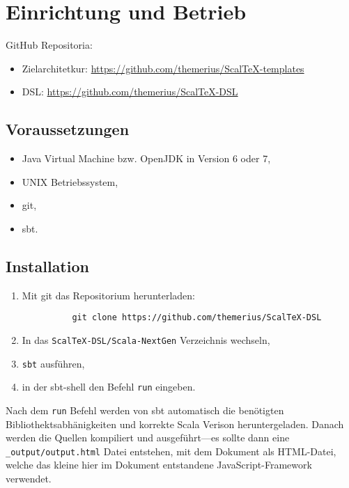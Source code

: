 \chapter{Einrichtung und Betrieb}

GitHub Repositoria:

\begin{itemize}
  \item Zielarchitetkur: \url{https://github.com/themerius/ScalTeX-templates}
  \item DSL: \url{https://github.com/themerius/ScalTeX-DSL}
\end{itemize}

\section{Voraussetzungen}

\begin{itemize}
  \item Java Virtual Machine bzw. OpenJDK in Version 6 oder 7,
  \item UNIX Betriebssystem,
  \item git,
  \item sbt.
\end{itemize}

\section{Installation}

\begin{enumerate}
  \item Mit git das Repositorium herunterladen:
        \begin{verbatim}
          git clone https://github.com/themerius/ScalTeX-DSL
        \end{verbatim}
  \item In das \verb+ScalTeX-DSL/Scala-NextGen+ Verzeichnis wechseln,
  \item \verb+sbt+ ausführen,
  \item in der sbt-shell den Befehl \verb+run+ eingeben.
\end{enumerate}

Nach dem \verb+run+ Befehl werden von sbt automatisch die benötigten
Bibliothektsabhänigkeiten und korrekte Scala Verison heruntergeladen.
Danach werden die Quellen kompiliert und ausgeführt---es sollte dann eine
\verb+_output/output.html+ Datei entstehen, mit dem Dokument als HTML-Datei,
welche das kleine hier im Dokument entstandene JavaScript-Framework verwendet.